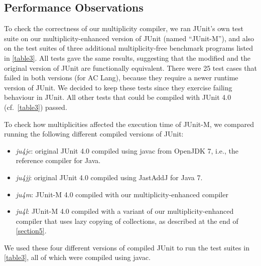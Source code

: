 {\subsection{Performance Observations}
\label{section6.3}

\noindent To check the correctness of our multiplicity compiler, we ran
JUnit's own test suite on our multiplicity-enhanced version of JUnit (named
``JUnit-M''), and also on the test suites of three additional
multiplicity-free benchmark programs listed in \autoref{table3}. All tests gave
the same results, suggesting that the modified and the original version of
JUnit are functionally equivalent. There were 25 test cases that failed in
both versions (for AC Lang), because they require a newer runtime version of
JUnit. We decided to keep these tests since they exercise failing behaviour
in JUnit. All other tests that could be compiled with JUnit 4.0
(cf.~\autoref{table3}) passed.

To check how multiplicities affected the execution time of JUnit-M, we
compared running the following different compiled versions of JUnit:

\begin{itemize}
  \item \emph{ju4jc}: original JUnit 4.0 compiled using javac from OpenJDK 7, i.e.,
    the reference compiler for Java.
  \item \emph{ju4jj}: original JUnit 4.0 compiled using JastAddJ for Java 7.
  \item \emph{ju4m}: JUnit-M 4.0 compiled with our multiplicity-enhanced compiler
  \item \emph{ju4l}: JUnit-M 4.0 compiled with a variant of our multiplicity-enhanced
    compiler that uses lazy copying of collections, as described at the end of
    \autoref{section5}.
\end{itemize}

\noindent We used these four different versions of compiled JUnit to run the
test suites in \autoref{table3}, all of which were compiled using javac.

}
